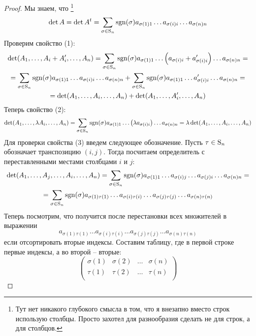 \begin{proof}
Мы знаем, что%
\footnote{Тут нет никакого глубокого смысла в том, что я внезапно вместо строк использую столбцы.
Просто захотел для разнообразия сделать не для строк, а для столбцов.}
\[
\det A = \det A^t = \sum_{\sigma\in\operatorname{S}_{n}}\operatorname{sgn}(\sigma)a_{\sigma(1)1} \ldots a_{\sigma(i)i}\ldots a_{\sigma(n)n}
\]
Проверим свойство (1):
\begin{gather*}
\det(A_1,\ldots, A_i + A_i', \ldots, A_n) = \sum_{\sigma\in\operatorname{S}_{n}}\operatorname{sgn}(\sigma)a_{\sigma(1)1} \ldots \left(a_{\sigma(i)i} + a_{\sigma(i)i}'\right)\ldots a_{\sigma(n)n}=\\
= \sum_{\sigma\in\operatorname{S}_{n}}\operatorname{sgn}(\sigma)a_{\sigma(1)1} \ldots a_{\sigma(i)i}\ldots a_{\sigma(n)n} +\sum_{\sigma\in\operatorname{S}_{n}}\operatorname{sgn}(\sigma)a_{\sigma(1)1} \ldots a_{\sigma(i)i}'\ldots a_{\sigma(n)n} =\\
= \det(A_1,\ldots, A_i, \ldots, A_n) + \det(A_1,\ldots,A_i', \ldots, A_n)
\end{gather*}
Теперь свойство (2):
\[
\det(A_1,\ldots, \lambda A_i, \ldots, A_n) = \sum_{\sigma\in\operatorname{S}_{n}}\operatorname{sgn}(\sigma)a_{\sigma(1)1} \ldots \left(\lambda a_{\sigma(i)i}\right)\ldots a_{\sigma(n)n}= \lambda \det(A_1,\ldots,  A_i, \ldots, A_n) 
\]
Для проверки свойства (3) введем следующее обозначение.
Пусть $\tau\in\operatorname{S}_{n}$ обозначает транспозицию $(i,j)$.
Тогда посчитаем определитель с переставленными местами столбцами $i$ и $j$:
\begin{gather*}
\det (A_1,\ldots, A_j, \ldots, A_i, \ldots, A_n) = \sum_{\sigma\in\operatorname{S}_{n}}\operatorname{sgn}(\sigma) a_{\sigma(1)1}\ldots a_{\sigma(i)j}\ldots a_{\sigma(j)i}\ldots a_{\sigma(n)n} = \\
=  \sum_{\sigma\in\operatorname{S}_{n}}\operatorname{sgn}(\sigma) a_{\sigma(1)\tau(1)}\ldots a_{\sigma(i)\tau(i)}\ldots a_{\sigma(j)\tau(j)}\ldots a_{\sigma(n)\tau(n)}
\end{gather*}
Теперь посмотрим, что получится после перестановки всех множителей в выражении 
\[
a_{\sigma(1)\tau(1)}\ldots a_{\sigma(i)\tau(i)}\ldots a_{\sigma(j)\tau(j)}\ldots a_{\sigma(n)\tau(n)}
\]
если отсортировать вторые индексы.
Составим таблицу, где в первой строке первые индексы, а во второй -- вторые:
\[
\begin{pmatrix}
{\sigma(1)}&{\sigma(2)}&{\ldots}&{\sigma(n)}\\
{\tau(1)}&{\tau(2)}&{\ldots}&{\tau(n)}\\

\end{pmatrix}\]
\end{proof}
